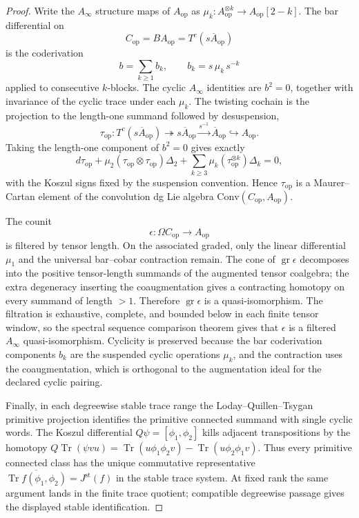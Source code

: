 \begin{proof}
Write the \(A_\infty\) structure maps of \(A_{\mathrm{op}}\) as
\(\mu_k:A_{\mathrm{op}}^{\otimes k}\to A_{\mathrm{op}}[2-k]\).  The
bar differential on
\[
  C_{\mathrm{op}}=BA_{\mathrm{op}}=T^c(s\overline A_{\mathrm{op}})
\]
is the coderivation
\[
  b=\sum_{k\ge1} b_k,\qquad
  b_k=s\,\mu_k\,s^{-k}
\]
applied to consecutive \(k\)-blocks.  The cyclic \(A_\infty\) identities
are \(b^2=0\), together with invariance of the cyclic trace under each
\(\mu_k\).  The twisting cochain is the projection to the length-one
summand followed by desuspension,
\[
  \tau_{\mathrm{op}}\colon
  T^c(s\overline A_{\mathrm{op}})
  \twoheadrightarrow s\overline A_{\mathrm{op}}
  \xrightarrow{s^{-1}}\overline A_{\mathrm{op}}
  \hookrightarrow A_{\mathrm{op}} .
\]
Taking the length-one component of \(b^2=0\) gives exactly
\[
  d\tau_{\mathrm{op}}
  +\mu_2(\tau_{\mathrm{op}}\otimes\tau_{\mathrm{op}})\Delta_2
  +\sum_{k\ge3}\mu_k(\tau_{\mathrm{op}}^{\otimes k})\Delta_k=0,
\]
with the Koszul signs fixed by the suspension convention.  Hence
\(\tau_{\mathrm{op}}\) is a Maurer--Cartan element of the convolution dg
Lie algebra
\(\mathrm{Conv}(C_{\mathrm{op}},A_{\mathrm{op}})\).

The counit
\[
  \epsilon\colon \Omega C_{\mathrm{op}}\longrightarrow A_{\mathrm{op}}
\]
is filtered by tensor length.  On the associated graded, only the
linear differential \(\mu_1\) and the universal bar--cobar contraction
remain.  The cone of \(\operatorname{gr}\epsilon\) decomposes into the
positive tensor-length summands of the augmented tensor coalgebra; the
extra degeneracy inserting the coaugmentation gives a contracting
homotopy on every summand of length \(>1\).  Therefore
\(\operatorname{gr}\epsilon\) is a quasi-isomorphism.  The filtration is
exhaustive, complete, and bounded below in each finite tensor window, so
the spectral sequence comparison theorem gives that \(\epsilon\) is a
filtered \(A_\infty\) quasi-isomorphism.  Cyclicity is preserved because
the bar coderivation components \(b_k\) are the suspended cyclic
operations \(\mu_k\), and the contraction uses the coaugmentation, which
is orthogonal to the augmentation ideal for the declared cyclic pairing.

Finally, in each degreewise stable trace range the
Loday--Quillen--Tsygan primitive
projection identifies the primitive connected summand with single cyclic
words.  The Koszul differential \(Q\psi=[\phi_1,\phi_2]\) kills adjacent
transpositions by the homotopy
\(Q\operatorname{Tr}(\psi vu)=
\operatorname{Tr}(u\phi_1\phi_2v)-
\operatorname{Tr}(u\phi_2\phi_1v)\).  Thus every primitive connected
class has the unique commutative representative
\(\overline{\operatorname{Tr} f(\phi_1,\phi_2)}
=J^{\mathrm{st}}(f)\) in the stable trace system.  At fixed rank the
same argument lands in the finite trace quotient; compatible
degreewise passage gives the displayed stable identification.
\end{proof}

